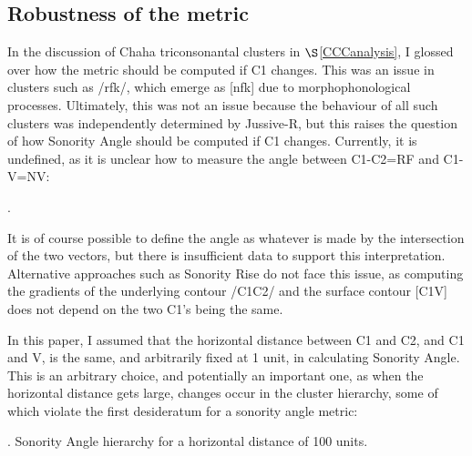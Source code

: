 \documentclass[12pt]{article}
\begin{document}
\subsection{Robustness of the metric}

 In the discussion of Chaha triconsonantal clusters in  $\S$\ref{CCCanalysis}, I glossed over how the metric should be computed if C1 changes.
This was an issue in clusters such as /rfk/, which emerge as [nfk] due to morphophonological processes. Ultimately, this was not an issue because the behaviour of all such clusters was independently determined by {\sc Jussive-R}, but this raises the question of how {\sc Sonority Angle} should be computed if C1 changes. Currently, it is undefined, as it is unclear how to measure the angle between C1-C2=RF and C1-V=NV:

\ex. 

It is of course possible to define the angle as whatever is made by the intersection of the two vectors, but there is insufficient data to support this interpretation. Alternative approaches such as {\sc Sonority Rise} do not face this issue, as computing the gradients of the underlying contour /C1C2/ and the surface contour [C1V] does not depend on the two C1's being the same.

\bigskip

 In this paper, I assumed that the horizontal distance between C1 and C2, and C1 and V, is the same, and arbitrarily fixed at 1 unit, in calculating {\sc Sonority Angle}. This is an arbitrary choice, and potentially an important one, as when the horizontal distance gets large, changes occur in the cluster hierarchy, some of which violate the first desideratum for a sonority angle metric:

\ex. {\sc Sonority Angle} hierarchy for a horizontal distance of 100 units.
\end{document}
